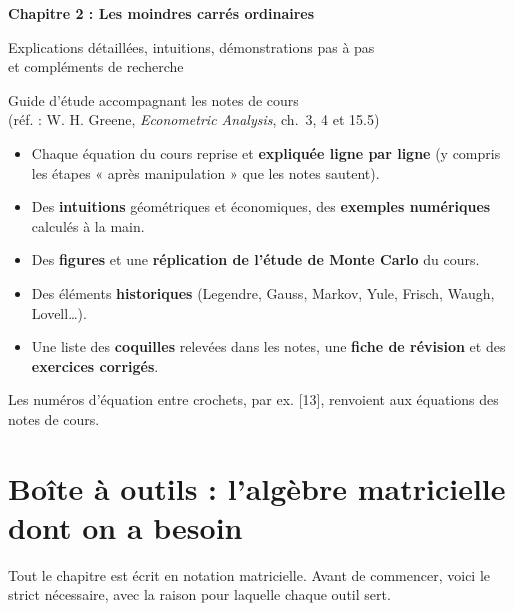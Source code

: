 \documentclass[11pt,a4paper]{article}
\begin{document}
\begin{titlepage}
\centering
\vspace*{2.5cm}
{\LARGE\bfseries Chapitre 2 : Les moindres carrés ordinaires\par}
\vspace{0.6cm}
{\Large Explications détaillées, intuitions, démonstrations pas à pas\\ et compléments de recherche\par}
\vspace{1.2cm}
{\large Guide d'étude accompagnant les notes de cours\\ (réf. : W. H. Greene, \emph{Econometric Analysis}, ch.~3, 4 et 15.5)\par}
\vspace{2cm}
\begin{tcolorbox}[colback=white,colframe=NavyBlue,width=0.85\textwidth,title=Ce que contient ce document]
\begin{itemize}[leftmargin=*]
\item Chaque équation du cours reprise et \textbf{expliquée ligne par ligne} (y compris les étapes « après manipulation » que les notes sautent).
\item Des \textbf{intuitions} géométriques et économiques, des \textbf{exemples numériques} calculés à la main.
\item Des \textbf{figures} et une \textbf{réplication de l'étude de Monte Carlo} du cours.
\item Des éléments \textbf{historiques} (Legendre, Gauss, Markov, Yule, Frisch, Waugh, Lovell\dots).
\item Une liste des \textbf{coquilles} relevées dans les notes, une \textbf{fiche de révision} et des \textbf{exercices corrigés}.
\end{itemize}
\end{tcolorbox}
\vfill
{\small Les numéros d'équation entre crochets, par ex. [13], renvoient aux équations des notes de cours.}
\end{titlepage}

\tableofcontents
\newpage

\section{Boîte à outils : l'algèbre matricielle dont on a besoin}

Tout le chapitre est écrit en notation matricielle. Avant de commencer, voici le strict nécessaire, avec la raison pour laquelle chaque outil sert.
\end{document}
